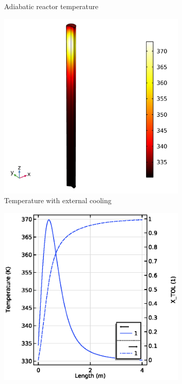 \begin{figure}[h]
    \centering
    
    \begin{subfigure}{0.32\linewidth}
        \label{fig:Adiabatic-without-cooling}
        \caption{Adiabatic reactor temperature}
    \end{subfigure}
    \begin{subfigure}{0.32\linewidth}
        \includegraphics[width=\linewidth]{figures/simple-tube-temperature.png}
        \caption{Temperature with external cooling}
    \end{subfigure}
    \begin{subfigure}{0.32\linewidth}
        \includegraphics[width=\linewidth]{figures/simple-tube-T-X.eps}

\end{subfigure}
\end{figure}
